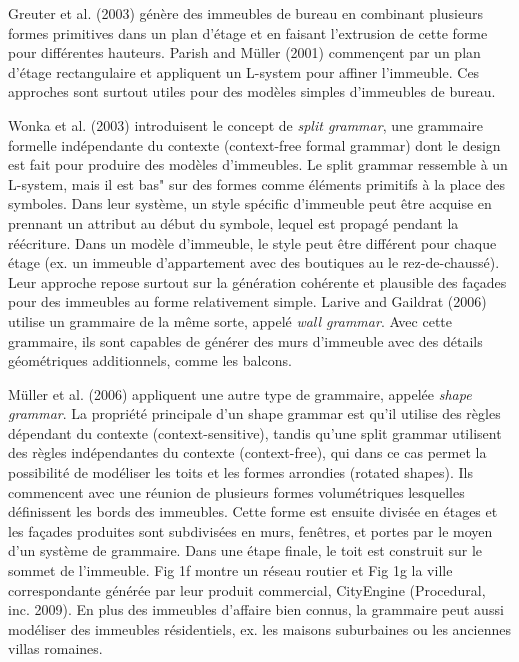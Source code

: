 \documentclass[11pt]{report}
\begin{document}
Greuter et al. (2003) génère des immeubles de bureau en combinant plusieurs formes primitives dans un plan d'étage et en faisant l'extrusion de cette forme pour différentes hauteurs. Parish and Müller (2001) commençent par un plan d'étage rectangulaire et appliquent un L-system pour affiner l'immeuble. Ces approches sont surtout utiles pour des modèles simples d'immeubles de bureau.  \newline

Wonka et al. (2003) introduisent le concept de \textit{split grammar}, une grammaire formelle indépendante du contexte (context-free formal grammar) dont le design est fait pour produire des modèles d'immeubles. Le split grammar ressemble à un L-system, mais il est bas" sur des formes comme éléments primitifs à la place des symboles. Dans leur système, un style spécific d'immeuble peut être acquise en prennant un attribut au début du symbole, lequel est propagé pendant la réécriture. Dans un modèle d'immeuble, le style peut être différent pour chaque étage (ex. un immeuble d'appartement avec des boutiques au le rez-de-chaussé). Leur approche repose surtout sur la génération cohérente et plausible des façades pour des immeubles au forme relativement simple. Larive and Gaildrat (2006) utilise un grammaire de la même sorte, appelé \textit{wall grammar}. Avec cette grammaire, ils sont capables de générer des murs d'immeuble avec des détails géométriques additionnels, comme les balcons. \newline

Müller et al. (2006) appliquent une autre type de grammaire, appelée \textit{shape grammar}. La propriété principale d'un shape grammar est qu'il utilise des règles dépendant du contexte (context-sensitive), tandis qu'une split grammar utilisent des règles indépendantes du contexte (context-free), qui dans ce cas permet la possibilité de modéliser les toits et les formes arrondies (rotated shapes). Ils commencent avec une réunion de plusieurs formes volumétriques lesquelles définissent les bords des immeubles. Cette forme est ensuite divisée en étages et les façades produites sont subdivisées en murs, fenêtres, et portes par le moyen d'un système de grammaire. Dans une étape finale, le toit est construit sur le sommet de l'immeuble. Fig 1f montre un réseau routier et Fig 1g la ville correspondante générée par leur produit commercial, CityEngine (Procedural, inc. 2009). En plus des immeubles d'affaire bien connus, la grammaire peut aussi modéliser des immeubles résidentiels, ex. les maisons suburbaines ou les anciennes villas romaines. \newline
\end{document}
